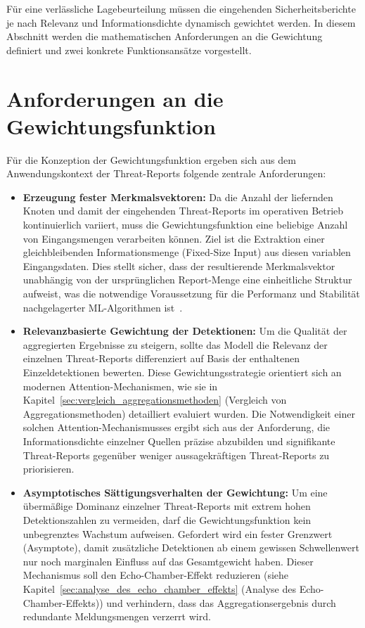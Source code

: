 Für eine verlässliche Lagebeurteilung müssen die eingehenden Sicherheitsberichte je nach Relevanz und Informationsdichte dynamisch gewichtet werden. In diesem Abschnitt werden die mathematischen Anforderungen an die Gewichtung definiert und zwei konkrete Funktionsansätze vorgestellt.

\section{Anforderungen an die Gewichtungsfunktion}
\label{sec:anforderungen_an_die_gewichtungsfunktion}

Für die Konzeption der Gewichtungsfunktion ergeben sich aus dem Anwendungskontext der Threat-Reports folgende zentrale Anforderungen:

\begin{itemize}
    \item \textbf{Erzeugung fester Merkmalsvektoren:} Da die Anzahl der liefernden Knoten und damit der eingehenden Threat-Reports im operativen Betrieb kontinuierlich variiert, muss die Gewichtungsfunktion eine beliebige Anzahl von Eingangsmengen verarbeiten können. Ziel ist die Extraktion einer gleichbleibenden Informationsmenge (Fixed-Size Input) aus diesen variablen Eingangsdaten. Dies stellt sicher, dass der resultierende Merkmalsvektor unabhängig von der ursprünglichen Report-Menge eine einheitliche Struktur aufweist, was die notwendige Voraussetzung für die Performanz und Stabilität nachgelagerter ML-Algorithmen ist~\cite{zaheer2017deepsets, velickovic2018gat}.

    \item \textbf{Relevanzbasierte Gewichtung der Detektionen:} Um die Qualität der aggregierten Ergebnisse zu steigern, sollte das Modell die Relevanz der einzelnen Threat-Reports differenziert auf Basis der enthaltenen Einzeldetektionen bewerten. Diese Gewichtungsstrategie orientiert sich an modernen Attention-Mechanismen, wie sie in Kapitel~\ref{sec:vergleich_aggregationsmethoden} (Vergleich von Aggregationsmethoden) detailliert evaluiert wurden. Die Notwendigkeit einer solchen Attention-Mechanismusses ergibt sich aus der Anforderung, die Informationsdichte einzelner Quellen präzise abzubilden und signifikante Threat-Reports gegenüber weniger aussagekräftigen Threat-Reports zu priorisieren.

    \item \textbf{Asymptotisches Sättigungsverhalten der Gewichtung:} 
    Um eine übermäßige Dominanz einzelner Threat-Reports mit extrem hohen Detektionszahlen zu vermeiden, darf die Gewichtungsfunktion kein unbegrenztes Wachstum aufweisen. Gefordert wird ein fester Grenzwert (Asymptote), damit zusätzliche Detektionen ab einem gewissen Schwellenwert nur noch marginalen Einfluss auf das Gesamtgewicht haben. Dieser Mechanismus soll den Echo-Chamber-Effekt reduzieren (siehe Kapitel~\ref{sec:analyse_des_echo_chamber_effekts} (Analyse des Echo-Chamber-Effekts)) und verhindern, dass das Aggregationsergebnis durch redundante Meldungsmengen verzerrt wird.
\end{itemize}